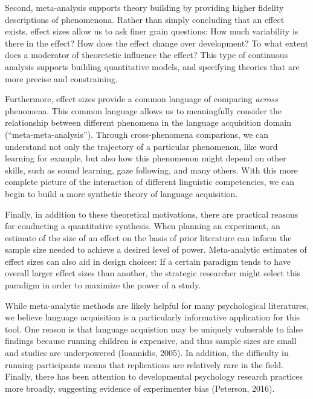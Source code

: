 \documentclass[english,floatsintext,man]{apa6}
\begin{document}
Second, meta-analysis supports theory building by providing higher
fidelity descriptions of phenomenona. Rather than simply concluding that
an effect exists, effect sizes allow us to ask finer grain questions:
How much variability is there in the effect? How does the effect change
over development? To what extent does a moderator of theoretetic
influence the effect? This type of continuous analysis supports building
quantitative models, and specifying theories that are more precise and
constraining.

Furthermore, effect sizes provide a common language of comparing
\emph{across} phenomena. This common language allows us to meaningfully
consider the relationship between different phenomena in the language
acquisition domain (\enquote{meta-meta-analysis}). Through
cross-phenomena comparions, we can understand not only the trajectory of
a particular phenomenon, like word learning for example, but also how
this phenomenon might depend on other skills, such as sound learning,
gaze following, and many others. With this more complete picture of the
interaction of different linguistic competencies, we can begin to build
a more synthetic theory of language acquisition.

Finally, in addition to these theoretical motivations, there are
practical reasons for conducting a quantitative synthesis. When planning
an experiment, an estimate of the size of an effect on the basis of
prior literature can inform the sample size needed to achieve a desired
level of power. Meta-analytic estimates of effect sizes can also aid in
design choices: If a certain paradigm tends to have overall larger
effect sizes than another, the strategic researcher might select this
paradigm in order to maximize the power of a study.

While meta-analytic methods are likely helpful for many psychological
literatures, we believe language acquisition is a particularly
informative application for this tool. One reason is that language
acquistion may be uniquely vulnerable to false findings because running
children is expensive, and thus sample sizes are small and studies are
underpowered (Ioannidis, 2005). In addition, the difficulty in running
participants means that replications are relatively rare in the field.
Finally, there has been attention to developmental psychology research
practices more broadly, suggesting evidence of experimenter bias
(Peterson, 2016).
\end{document}
